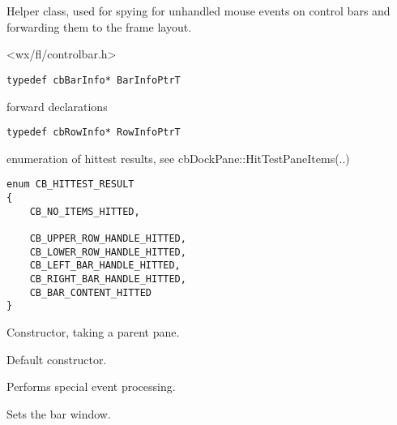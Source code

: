 %
%


\section{}\label{cbbarspy}


Helper class, used for spying for unhandled mouse events on control bars
and forwarding them to the frame layout.




<wx/fl/controlbar.h>


{\small \begin{verbatim}
typedef cbBarInfo* BarInfoPtrT
\end{verbatim}}
forward declarations

{\small \begin{verbatim}
typedef cbRowInfo* RowInfoPtrT
\end{verbatim}}
enumeration of hittest results, see cbDockPane::HitTestPaneItems(..)
\begin{verbatim}
enum CB_HITTEST_RESULT
{
    CB_NO_ITEMS_HITTED,

    CB_UPPER_ROW_HANDLE_HITTED,
    CB_LOWER_ROW_HANDLE_HITTED,
    CB_LEFT_BAR_HANDLE_HITTED,
    CB_RIGHT_BAR_HANDLE_HITTED,
    CB_BAR_CONTENT_HITTED
}
\end{verbatim}



\label{cbbarspycbbarspy}


Constructor, taking a parent pane.



Default constructor.


\label{cbbarspyprocessevent}


Performs special event processing.


\label{cbbarspysetbarwindow}


Sets the bar window.

